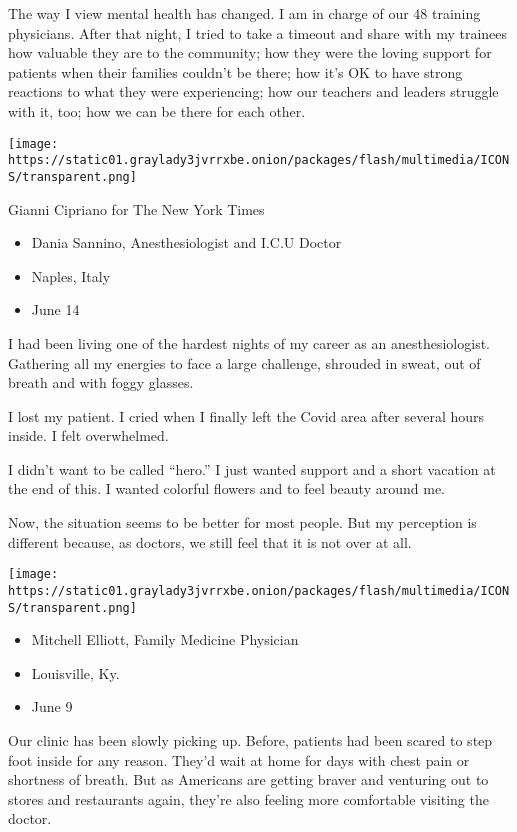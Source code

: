 The way I view mental health has changed. I am in charge of our 48
training physicians. After that night, I tried to take a timeout and
share with my trainees how valuable they are to the community; how they
were the loving support for patients when their families couldn't be
there; how it's OK to have strong reactions to what they were
experiencing; how our teachers and leaders struggle with it, too; how we
can be there for each other.

\texttt{[image: https://static01.graylady3jvrrxbe.onion/packages/flash/multimedia/ICONS/transparent.png]}

Gianni Cipriano for The New York Times

\begin{itemize}
\tightlist
\item
  Dania Sannino, Anesthesiologist and I.C.U Doctor
\item
  Naples, Italy
\item
  June 14
\end{itemize}

I had been living one of the hardest nights of my career as an
anesthesiologist. Gathering all my energies to face a large challenge,
shrouded in sweat, out of breath and with foggy glasses.

I lost my patient. I cried when I finally left the Covid area after
several hours inside. I felt overwhelmed.

I didn't want to be called ``hero.'' I just wanted support and a short
vacation at the end of this. I wanted colorful flowers and to feel
beauty around me.

Now, the situation seems to be better for most people. But my perception
is different because, as doctors, we still feel that it is not over at
all.

\texttt{[image: https://static01.graylady3jvrrxbe.onion/packages/flash/multimedia/ICONS/transparent.png]}

\begin{itemize}
\tightlist
\item
  Mitchell Elliott, Family Medicine Physician
\item
  Louisville, Ky.
\item
  June 9
\end{itemize}

Our clinic has been slowly picking up. Before, patients had been scared
to step foot inside for any reason. They'd wait at home for days with
chest pain or shortness of breath. But as Americans are getting braver
and venturing out to stores and restaurants again, they're also feeling
more comfortable visiting the doctor.

